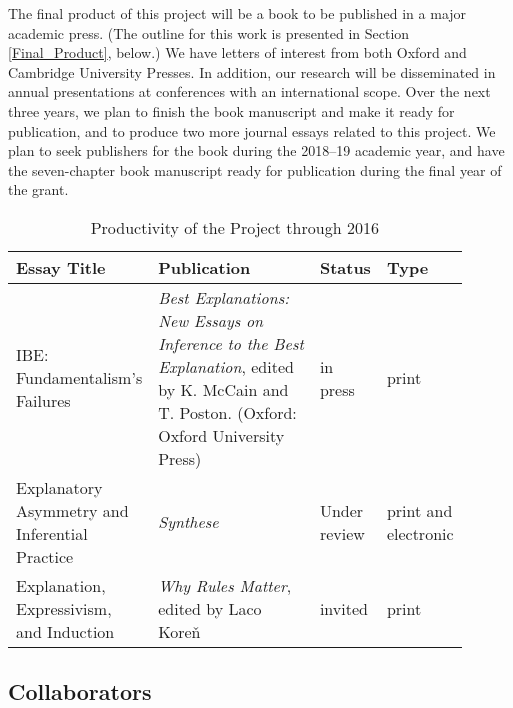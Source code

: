 \documentclass{article}[11pt]
\begin{document}
The final product of this project will be a book to be published in a major academic press.  (The outline for this work is presented in Section \ref{Final_Product}, below.) We have letters of interest from both Oxford and Cambridge University Presses. In addition, our research will be disseminated in annual presentations at conferences with an international scope. Over the next three years, we plan to finish the book manuscript and make it ready for publication, and to produce two more journal essays related to this project.   We plan to seek publishers for the book during the 2018--19 academic year, and have the seven-chapter book manuscript ready for publication during the final year of the grant. 

\singlespacing
\renewcommand{\arraystretch}{1.5}
\begin{table}[!htbp]
\begin{tabular} {|m{0.3\linewidth}|m{0.4\linewidth}|m{0.1\linewidth}|m{0.1\linewidth}|}
	\hline  \textbf{Essay Title} & \textbf{Publication} & \textbf{Status}& \textbf{Type} \\ 
	\hline  IBE: Fundamentalism's Failures & \textit{Best Explanations: New Essays on Inference to the Best Explanation}, edited by K. McCain and T. Poston. (Oxford: Oxford University Press)  &  in press & print \\ 
	\hline  Explanatory Asymmetry and Inferential Practice & \textit{Synthese} & Under review & print and electronic\\ 
	\hline  Explanation, Expressivism, and Induction & \textit{Why Rules Matter}, edited by Laco Kore\v{n}
	 & invited & print \\ 
	\hline 
\end{tabular}
\caption{Productivity of the Project through 2016}
\end{table}
\doublespacing


\clearpage
{}
\subsection{Collaborators}

\end{document}
